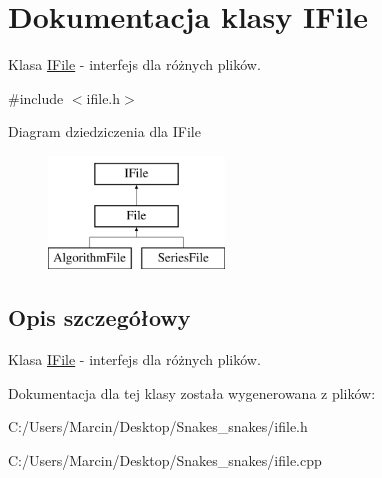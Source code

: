 \hypertarget{class_i_file}{\section{Dokumentacja klasy I\+File}
\label{class_i_file}
}


Klasa \hyperlink{class_i_file}{I\+File} -\/ interfejs dla różnych plików.  




{\ttfamily \#include $<$ifile.\+h$>$}

Diagram dziedziczenia dla I\+File\begin{figure}[H]
\begin{center}
\leavevmode
\includegraphics[height=3.000000cm]{class_i_file}
\end{center}
\end{figure}


\subsection{Opis szczegółowy}
Klasa \hyperlink{class_i_file}{I\+File} -\/ interfejs dla różnych plików. 

Dokumentacja dla tej klasy została wygenerowana z plików\+:\begin{DoxyCompactItemize}
\item 
C\+:/\+Users/\+Marcin/\+Desktop/\+Snakes\+\_\+snakes/ifile.\+h\item 
C\+:/\+Users/\+Marcin/\+Desktop/\+Snakes\+\_\+snakes/ifile.\+cpp\end{DoxyCompactItemize}
